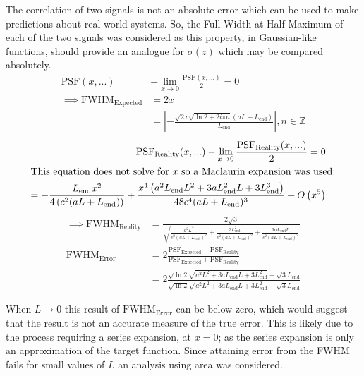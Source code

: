 The correlation of two signals is not an absolute error which can be used to make predictions about real-world systems. So, the Full Width at Half Maximum of each of the two signals was considered as this property, in Gaussian-like functions, should provide an analogue for $\sigma(z)$ which may be compared absolutely.
\begin{align*}
\text{PSF}(x,...) &- \lim_{x\to0} \frac{\text{PSF}(x,...)}{2} = 0 \\
\implies \text{FWHM}_{\text{Expected}} &= 2x \\
&= \left|-\frac{\sqrt{2} c \sqrt{\ln{2} +2 i \pi  n} (a L+L_{\text{end}})}{L_{\text{end}}}\right|,n\in \mathbb{Z}
\end{align*}
\begin{align*}
\text{PSF}_{\text{Reality}}(x,...) - \lim_{x\to0} \frac{\text{PSF}_{\text{Reality}}(x,...)}{2} = 0 \\
\intertext{This equation does not solve for $x$ so a Maclaurin expansion was used:}
= -\frac{L_{\text{end}} x^2}{4 \left(c^2 (a L+L_{\text{end}})\right)}+\frac{x^4 \left(a^2 L_{\text{end}} L^2+3 a L_{\text{end}}^2 L+3 L_{\text{end}}^3\right)}{48 c^4 (a L+L_{\text{end}})^3}+O\left(x^5\right)
\end{align*}
\begin{align*}
\implies \text{FWHM}_{\text{Reality}} &= \frac{2 \sqrt{3}}{\sqrt{\frac{a^2 L^2}{c^2 (a L+L_{\text{end}})^2}+\frac{3 L_{\text{end}}^2}{c^2 (a L+L_{\text{end}})^2}+\frac{3 a L_{\text{end}} L}{c^2 (a L+L_{\text{end}})^2}}}\\
\text{FWHM}_\text{Error} &= 2\frac{\text{PSF}_{\text{Expected}} - \text{PSF}_{\text{Reality}}}{\text{PSF}_{\text{Expected}} + \text{PSF}_{\text{Reality}}}\\
& = 2\frac{\sqrt{\ln{2}} \sqrt{a^2 L^2+3 a L_{\text{end}} L+3 L_{\text{end}}^2}-\sqrt{3} L_{\text{end}}}{\sqrt{\ln{2}} \sqrt{a^2 L^2+3 a L_{\text{end}} L+3 L_{\text{end}}^2}+\sqrt{3} L_{\text{end}}}
\end{align*}

When $L\to0$ this result of $\text{FWHM}_\text{Error}$ can be below zero, which would suggest that the result is not an accurate measure of the true error.
This is likely due to the process requiring a series expansion, at $x=0$; as the series expansion is only an approximation of the target function.
Since attaining error from the FWHM fails for small values of $L$ an analysis using area was considered.
